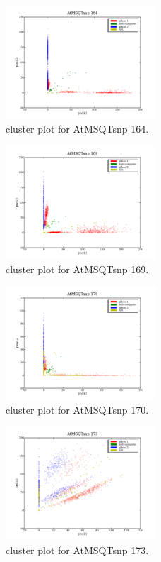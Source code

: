 \begin{figure}[H]
\includegraphics[width=0.5\textwidth]{figures/cluster_plot_AtMSQTsnp_164.png}
\caption{cluster plot for AtMSQTsnp 164.} \label{flAtMSQTsnp164}
\end{figure}
\begin{figure}[H]
\includegraphics[width=0.5\textwidth]{figures/cluster_plot_AtMSQTsnp_169.png}
\caption{cluster plot for AtMSQTsnp 169.} \label{flAtMSQTsnp169}
\end{figure}
\begin{figure}[H]
\includegraphics[width=0.5\textwidth]{figures/cluster_plot_AtMSQTsnp_170.png}
\caption{cluster plot for AtMSQTsnp 170.} \label{flAtMSQTsnp170}
\end{figure}
\begin{figure}[H]
\includegraphics[width=0.5\textwidth]{figures/cluster_plot_AtMSQTsnp_173.png}
\caption{cluster plot for AtMSQTsnp 173.} \label{flAtMSQTsnp173}
\end{figure}
